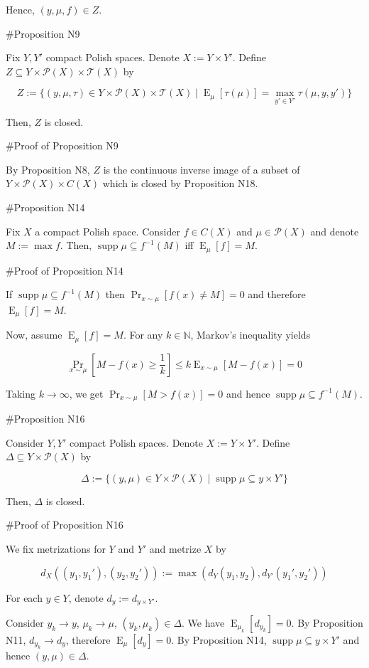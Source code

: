 \documentclass[a4paper]{article}
\DeclareMathOperator{\Supp}{supp}
\DeclareMathOperator{\Prb}{Pr}
\DeclareMathOperator{\E}{E}
\newcommand{\Nats}{\mathbb{N}}
\newcommand{\Prob}{\mathcal{P}}
\newcommand{\T}{\mathcal{T}}
\begin{document}
Hence, ${(y,\mu,f) \in Z}$.

\#Proposition N9

Fix ${Y,Y'}$ compact Polish spaces. Denote ${X:=Y \times Y'}$. Define ${Z \subseteq Y \times \Prob(X) \times \T(X)}$ by

$$Z:=\{(y,\mu,\tau) \in Y \times \Prob(X) \times \T(X) \mid \E_\mu[\tau(\mu)] = \max_{y' \in Y'} \tau(\mu,y,y')\}$$

Then, ${Z}$ is closed.

\#Proof of Proposition N9

By Proposition N8, ${Z}$ is the continuous inverse image of a subset of ${Y \times \Prob(X) \times C(X)}$ which is closed by Proposition N18.

\#Proposition N14

Fix ${X}$ a compact Polish space. Consider ${f \in C(X)}$ and ${\mu \in \Prob(X)}$ and denote ${M := \max f}$. Then, ${\Supp \mu \subseteq f^{-1}(M)}$ iff ${\E_\mu[f] = M}$.

\#Proof of Proposition N14

If ${\Supp \mu \subseteq f^{-1}(M)}$ then $\Prb_{x\sim \mu}[f(x) \ne M] = 0$ and therefore ${\E_\mu[f] = M}$.

Now, assume ${\E_\mu[f] = M}$. For any ${k \in \Nats}$, Markov's inequality yields 

$$\Prb_{x\sim \mu}[M - f(x) \geq \frac{1}{k}] \leq k\E_{x \sim \mu}[M - f(x)] = 0$$

Taking $k \rightarrow \infty$, we get ${\Prb_{x\sim \mu}[M > f(x)] = 0}$ and hence ${\Supp \mu \subseteq f^{-1}(M)}$.

\#Proposition N16

Consider ${Y,Y'}$ compact Polish spaces. Denote ${X:=Y \times Y'}$. Define ${\Delta \subseteq Y \times \Prob(X)}$ by

$$\Delta:=\{(y,\mu) \in Y \times \Prob(X) \mid \Supp \mu \subseteq y \times Y'\}$$

Then, ${\Delta}$ is closed.

\#Proof of Proposition N16

We fix metrizations for ${Y}$ and ${Y'}$ and metrize ${X}$ by 

$${d_X((y_1,y_1'),(y_2,y_2')):=\max(d_Y(y_1,y_2),d_{Y'}(y_1',y_2'))}$$

For each ${y \in Y}$, denote ${d_{y}:=d_{y \times Y'}}$.

Consider ${y_k \rightarrow y}$, ${\mu_k \rightarrow \mu}$, ${(y_k, \mu_k) \in \Delta}$. We have ${\E_{\mu_k}[d_{y_k}]=0}$. By Proposition N11, ${d_{y_k} \rightarrow d_y}$, therefore ${\E_\mu[d_y] = 0}$. By Proposition N14, ${\Supp \mu \subseteq y \times Y'}$ and hence ${(y,\mu) \in \Delta}$.
\end{document}
